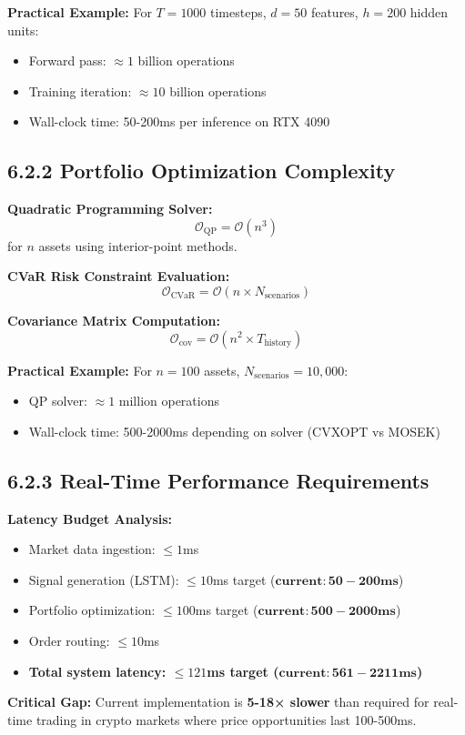 \documentclass[11pt,a4paper]{article}
\begin{document}
\textbf{Practical Example:} For $T=1000$ timesteps, $d=50$ features, $h=200$ hidden units:
\begin{itemize}
\item Forward pass: $\approx 1$ billion operations  
\item Training iteration: $\approx 10$ billion operations
\item Wall-clock time: 50-200ms per inference on RTX 4090

\end{itemize}
\subsection{6.2.2 Portfolio Optimization Complexity}

\textbf{Quadratic Programming Solver:}
\begin{equation}
\mathcal{O}_{\text{QP}} = \mathcal{O}(n^3)
\end{equation}
for $n$ assets using interior-point methods.

\textbf{CVaR Risk Constraint Evaluation:}
\begin{equation}
\mathcal{O}_{\text{CVaR}} = \mathcal{O}(n \times N_{\text{scenarios}})
\end{equation}

\textbf{Covariance Matrix Computation:}
\begin{equation}
\mathcal{O}_{\text{cov}} = \mathcal{O}(n^2 \times T_{\text{history}})
\end{equation}

\textbf{Practical Example:} For $n=100$ assets, $N_{\text{scenarios}}=10,000$:
\begin{itemize}
\item QP solver: $\approx 1$ million operations
\item Wall-clock time: 500-2000ms depending on solver (CVXOPT vs MOSEK)

\end{itemize}
\subsection{6.2.3 Real-Time Performance Requirements}

\textbf{Latency Budget Analysis:}
\begin{itemize}
\item Market data ingestion: $\leq 1$ms
\item Signal generation (LSTM): $\leq 10$ms target ($\mathbf{current: 50-200ms}$)
\item Portfolio optimization: $\leq 100$ms target ($\mathbf{current: 500-2000ms}$)
\item Order routing: $\leq 10$ms
\item \textbf{Total system latency: $\leq 121$ms target ($\mathbf{current: 561-2211ms}$)}

\end{itemize}
\textbf{Critical Gap:} Current implementation is \textbf{5-18× slower} than required for real-time trading in crypto markets where price opportunities last 100-500ms.
\end{document}
